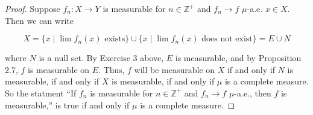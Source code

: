 \documentclass[11pt,oneside,english]{amsart}
\theoremstyle{definition}
\begin{document}
\begin{enumerate}
\begin{enumerate}
\begin{proof}
Suppose $f_n:X\rightarrow Y$ is measurable for $n\in\mathbb{Z}^+$ and $f_n\rightarrow f$ $\mu$-a.e. $x\in X$. Then we can write

\[
X=\{x\mid \lim f_n(x)\text{ exists}\}\cup\{x\mid \lim f_n(x)\text{ does not exist}\}=E\cup N
\]

where $N$ is a null set. By Exercise 3 above, $E$ is measurable, and by Proposition 2.7, $f$ is measurable on $E$. Thus, $f$ will be measurable on $X$ if and only if $N$ is measurable, if and only if $X$ is measurable, if and only if $\mu$ is a complete measure. So the statment ``If $f_n$ is measurable for $n\in\mathbb{Z}^+$ and $f_n\rightarrow f$ $\mu$-a.e., then $f$ is measurable,'' is true if and only if $\mu$ is a complete measure.
\end{proof}

\end{enumerate}

\end{enumerate}
\end{document}
